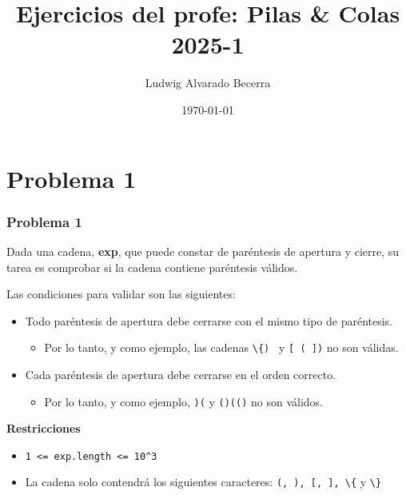 \documentclass[17pt, t, lualatex]{beamer}
\title{\LARGE Ejercicios del profe: Pilas \& Colas 2025-1}
\date{\today}
\institute[UJTL]{Universidad Jorge Tadeo Lozano - Semillero de Programación Competitiva}
\author{Ludwig Alvarado Becerra}
\newcommand{\cppinline}[1]{\lstinline[style=cppstyle]!#1!}
\begin{document}
\inserttitlepage

\section{Problema 1}

\insertsectionpage


\begin{frame}
  \frametitle{Problema 1}

  Dada una cadena, \textbf{exp}, que puede constar de paréntesis de apertura y cierre, su tarea es comprobar si la cadena contiene paréntesis válidos.

  Las condiciones para validar son las siguientes:

  \begin{itemize}
    \item Todo paréntesis de apertura debe cerrarse con el mismo tipo de paréntesis.
          \begin{itemize}
            \item Por lo tanto, y como ejemplo, las cadenas \cppinline{\{) } y \cppinline{[ ( ])} no son válidas.
          \end{itemize}
    \item Cada paréntesis de apertura debe cerrarse en el orden correcto.
          \begin{itemize}
            \item Por lo tanto, y como ejemplo, \cppinline{)(} y \cppinline{()(()} no son válidos.
          \end{itemize}
  \end{itemize}

  \textbf{Restricciones}

  \begin{itemize}
    \item \cppinline{1 <= exp.length <= 10^3}
    \item La cadena solo contendrá los siguientes caracteres: \cppinline{(, ), [, ], \{} y \cppinline{\} }
  \end{itemize}

\end{frame}
\end{document}
